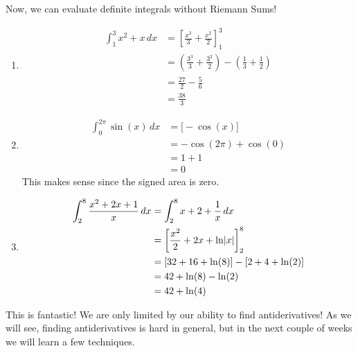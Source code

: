 Now, we can evaluate definite integrals without Riemann Sums!

\begin{Example}{}{}
    \begin{enumerate}[label=(\roman*)]
        \item \begin{align*}
                  \int_{1}^{3} x^2+x\, d{x}
                   & =\left[\frac{x^3}{3}+\frac{x^2}{2}\right]_{1}^3                                      \\
                   & = \left( \frac{3^3}{3} +\frac{3^2}{2} \right)-\left( \frac{1}{3}+\frac{1}{2} \right) \\
                   & =\frac{27}{2} -\frac{5}{6}                                                           \\
                   & =\frac{38}{3}
              \end{align*}
        \item \begin{align*}
                  \int_{0}^{2\pi} \sin(x)\, d{x}
                   & =\bigl[-\cos(x)\bigr] \\
                   & =-\cos(2\pi)+\cos(0)  \\
                   & =1+1                  \\
                   & =0
              \end{align*}
              This makes sense since the signed area is zero.
        \item \begin{align*}
                  \int_{2}^{8} \frac{x^2+2x+1}{x} \, d{x}
                   & =\int_{2}^{8} x+2+\frac{1}{x}\, d{x}              \\
                   & =\left[\frac{x^2}{2} +2x+\ln\lvert x\rvert \right]_{2}^8 \\
                   & =[32+16+\ln(8)]-[2+4+\ln(2)]                      \\
                   & =42+\ln(8)-\ln(2)                                 \\
                   & =42+\ln(4)
              \end{align*}
    \end{enumerate}
\end{Example}

This is fantastic! We are only limited by our ability to find antiderivatives!
As we will see, finding antiderivatives is hard in general, but in the next couple of
weeks we will learn a few techniques.

